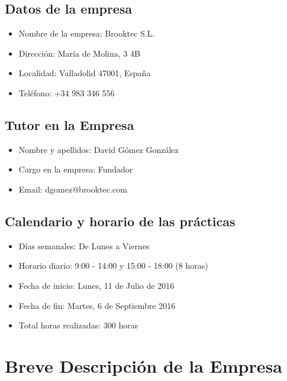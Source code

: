 \documentclass[11pt, a4paper,spanish]{article}
\begin{document}
        \subsection{Datos de la empresa}

            \begin{itemize}
              \item Nombre de la empresa: Brooktec S.L.
              \item Dirección:  María de Molina, 3 4B
              \item Localidad:  Valladolid 47001, España
              \item Teléfono:  +34 983 346 556
            \end{itemize}


        \subsection{Tutor en la Empresa}

            \begin{itemize}
              \item Nombre y apellidos: David Gómez González
              \item Cargo en la empresa: Fundador
              \item Email: dgomez@brooktec.com
            \end{itemize}


        \subsection{Calendario y horario de las prácticas}

            \begin{itemize}
              \item Días semanales: De Lunes a Viernes
              \item Horario diario: 9:00 - 14:00 y 15:00 - 18:00 (8 horas)
              \item Fecha de inicio: Lunes, 11 de Julio de 2016
              \item Fecha de fin:  Martes, 6 de Septiembre 2016
              \item Total horas realizadas: 300 horas
            \end{itemize}

	\newpage
    \section{Breve Descripción de la Empresa}
\end{document}
